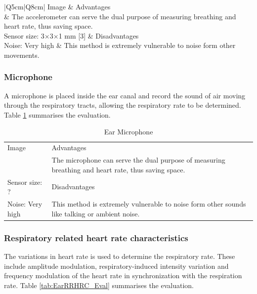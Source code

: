 \begin{table}[H]
\caption{Ear Accelerometer}
\label{tab:EarAccelerometer_Eval}
\renewcommand{\arraystretch}{1.3}	%
\centering
\begin{tabular}{|Q{5cm}|Q{8cm}|} 
 \hline
 Image 		& 	Advantages  \\ 
  			&	\tabitem The accelerometer can serve the dual purpose of measuring breathing and heart rate, thus saving space.\\
\hline
Sensor size: 3$\times$3$\times$1 mm	[3]					&	Disadvantages  \\ 
Noise: Very high							&	\tabitem This method is extremely vulnerable to noise form other movements.\\
 \hline
\end{tabular}
\end{table}

\subsubsection{Microphone}
A microphone is placed inside the ear canal and record the sound of air moving through the respiratory tracts, allowing the respiratory rate to be determined. Table \ref{tab:EarMicrophone_Eval} summarises the evaluation.

\begin{table}[H]
\caption{Ear Microphone}
\label{tab:EarMicrophone_Eval}
\renewcommand{\arraystretch}{1.3}	%
\centering
\begin{tabular}{|p{5cm}|p{8cm}|} 
 \hline
 Image 		& 	Advantages  \\ 
  			&	\tabitem The microphone can serve the dual purpose of measuring breathing and heart rate, thus saving space.\\
\hline
Sensor size: ?					&	Disadvantages  \\ 
Noise: Very high	&	\tabitem This method is extremely vulnerable to noise form other sounds like talking or ambient noise.\\
 \hline
\end{tabular}
\end{table}

\subsubsection{Respiratory related heart rate characteristics}
The variations in heart rate is used to determine the respiratory rate. These include amplitude modulation, respiratory-induced intensity variation and frequency modulation of the heart rate in synchronization with the respiration rate. Table \ref{tab:EarRRHRC_Eval} summarises the evaluation.

